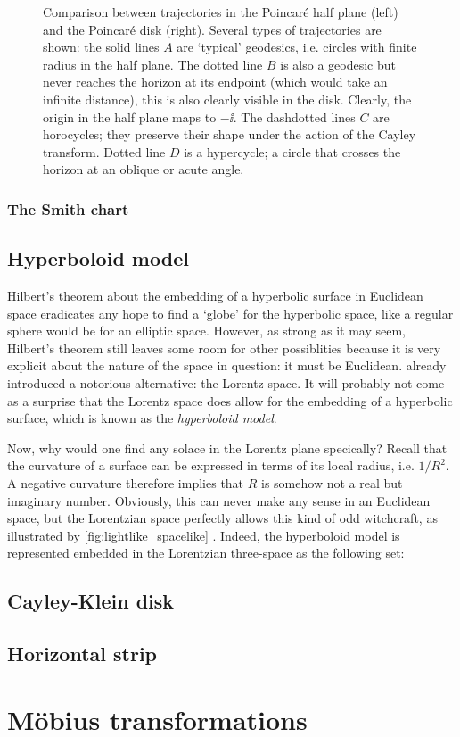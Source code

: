 \begin{figure}[ht]
    \centering
    
    \label{fig:halfplane_disk}
    \caption{Comparison between trajectories in the Poincaré half plane (left) and the Poincaré disk (right). Several types of trajectories are shown: the solid lines \(A\) are `typical' geodesics, i.e. circles with finite radius in the half plane. The dotted line \(B\) is also a geodesic but never reaches the horizon at its endpoint (which would take an infinite distance), this is also clearly visible in the disk. Clearly, the origin in the half plane maps to \(-\ii\). The dashdotted lines \(C\) are horocycles; they preserve their shape under the action of the Cayley transform. Dotted line \(D\) is a hypercycle; a circle that crosses the horizon at an oblique or acute angle.}
\end{figure}

\subsubsection{The Smith chart}

\subsection{Hyperboloid model}
Hilbert's theorem about the embedding of a hyperbolic surface in Euclidean space eradicates any hope to find a `globe' for the hyperbolic space, like a regular sphere would be for an elliptic space. However, as strong as it may seem, Hilbert's theorem still leaves some room for other possiblities because it is very explicit about the nature of the space in question: it must be Euclidean.  already introduced a notorious alternative: the Lorentz space. It will probably not come as a surprise that the Lorentz space does allow for the embedding of a hyperbolic surface, which is known as the \emph{hyperboloid model}.

Now, why would one find any solace in the Lorentz plane specically? Recall that the curvature of a surface can be expressed in terms of its local radius, i.e. \(1/R^2\). A negative curvature therefore implies that \(R\) is somehow not a real but imaginary number. Obviously, this can never make any sense in an Euclidean space, but the Lorentzian space perfectly allows this kind of odd witchcraft, as illustrated by \cref{fig:lightlike_spacelike} \cite{Ratcliffe2019}. Indeed, the hyperboloid model is represented embedded in the Lorentzian three-space as the following set:
\[  \]
\subsection{Cayley-Klein disk}
\subsection{Horizontal strip}

\section{Möbius transformations}
\label{sec:mobius}

